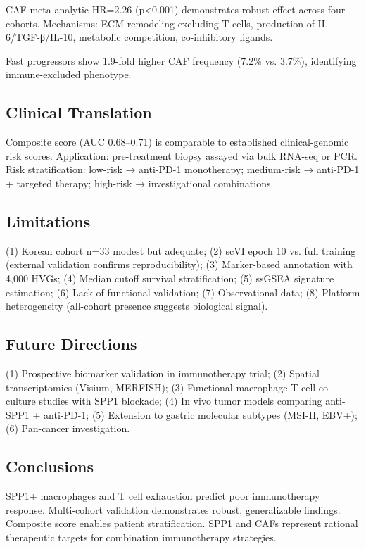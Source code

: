 \documentclass[12pt,twoside]{article}
\begin{document}
CAF meta-analytic HR=2.26 (p<0.001) demonstrates robust effect across four cohorts. Mechanisms: ECM remodeling excluding T cells, production of IL-6/TGF-β/IL-10, metabolic competition, co-inhibitory ligands.

Fast progressors show 1.9-fold higher CAF frequency (7.2\% vs. 3.7\%), identifying immune-excluded phenotype.

\subsection{Clinical Translation}

Composite score (AUC 0.68--0.71) is comparable to established clinical-genomic risk scores. Application: pre-treatment biopsy assayed via bulk RNA-seq or PCR. Risk stratification: low-risk → anti-PD-1 monotherapy; medium-risk → anti-PD-1 + targeted therapy; high-risk → investigational combinations.

\subsection{Limitations}

(1) Korean cohort n=33 modest but adequate; (2) scVI epoch 10 vs. full training (external validation confirms reproducibility); (3) Marker-based annotation with 4,000 HVGs; (4) Median cutoff survival stratification; (5) ssGSEA signature estimation; (6) Lack of functional validation; (7) Observational data; (8) Platform heterogeneity (all-cohort presence suggests biological signal).

\subsection{Future Directions}

(1) Prospective biomarker validation in immunotherapy trial; (2) Spatial transcriptomics (Visium, MERFISH); (3) Functional macrophage-T cell co-culture studies with SPP1 blockade; (4) In vivo tumor models comparing anti-SPP1 + anti-PD-1; (5) Extension to gastric molecular subtypes (MSI-H, EBV+); (6) Pan-cancer investigation.

\subsection{Conclusions}

SPP1+ macrophages and T cell exhaustion predict poor immunotherapy response. Multi-cohort validation demonstrates robust, generalizable findings. Composite score enables patient stratification. SPP1 and CAFs represent rational therapeutic targets for combination immunotherapy strategies.
\end{document}
